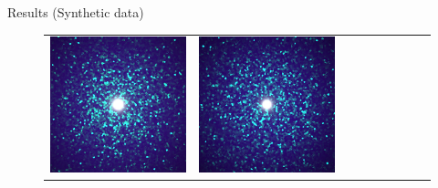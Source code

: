 \documentclass[final]{beamer}
\newlength{\twocolwid}
\newlength{\resultwidth}
\begin{document}
\begin{frame}[t]
\begin{columns}[t]
\begin{column}{\twocolwid}
\begin{block}{Results (Synthetic data)}
\begin{figure}[t]
\begin{tabular}{ccrclcccc}
            		\includegraphics[width=\resultwidth]{synth/flake/good3.jpg} &
            		\includegraphics[width=\resultwidth]{synth/flake/bad1.jpg}
            		\\

\end{tabular}
\end{figure}
\end{block}
\end{column}
\end{columns}
\end{frame}
\end{document}
